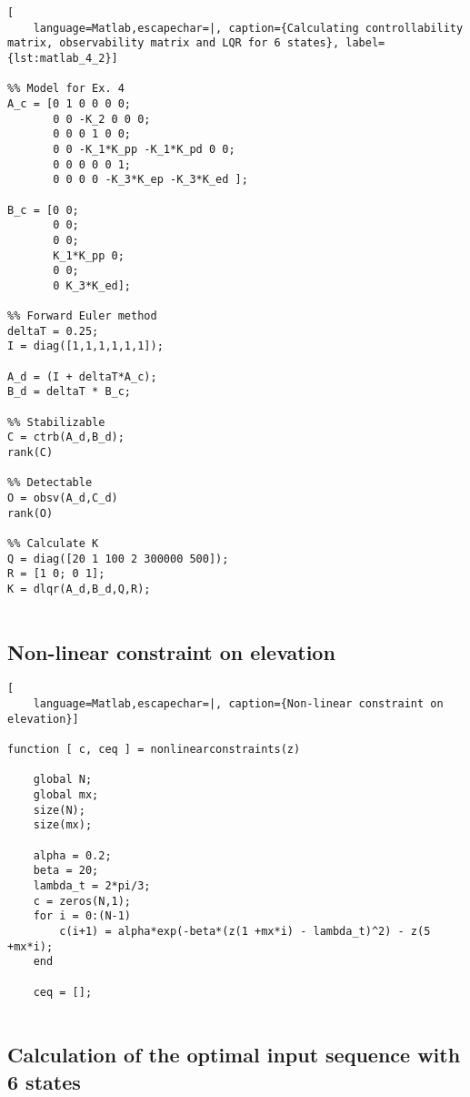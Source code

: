 \begin{lstlisting}[
    language=Matlab,escapechar=|, caption={Calculating controllability matrix, observability matrix and LQR for 6 states}, label={lst:matlab_4_2}]

%% Model for Ex. 4
A_c = [0 1 0 0 0 0;
       0 0 -K_2 0 0 0;
       0 0 0 1 0 0;
       0 0 -K_1*K_pp -K_1*K_pd 0 0; 
       0 0 0 0 0 1;
       0 0 0 0 -K_3*K_ep -K_3*K_ed ];
       
B_c = [0 0;
       0 0;
       0 0;
       K_1*K_pp 0;
       0 0;
       0 K_3*K_ed];

%% Forward Euler method
deltaT = 0.25;
I = diag([1,1,1,1,1,1]);

A_d = (I + deltaT*A_c);
B_d = deltaT * B_c;

%% Stabilizable
C = ctrb(A_d,B_d);
rank(C)

%% Detectable
O = obsv(A_d,C_d)
rank(O)

%% Calculate K
Q = diag([20 1 100 2 300000 500]);
R = [1 0; 0 1];
K = dlqr(A_d,B_d,Q,R);   
    
\end{lstlisting}
\newpage

\subsection{Non-linear constraint on elevation }\label{sec:matlab_connstrains}
\begin{lstlisting}[
    language=Matlab,escapechar=|, caption={Non-linear constraint on elevation}]

function [ c, ceq ] = nonlinearconstraints(z)
    
    global N;
    global mx;
    size(N);
    size(mx);
    
    alpha = 0.2;
    beta = 20;
    lambda_t = 2*pi/3;
    c = zeros(N,1);
    for i = 0:(N-1)
        c(i+1) = alpha*exp(-beta*(z(1 +mx*i) - lambda_t)^2) - z(5 +mx*i);
    end

    ceq = [];
    
\end{lstlisting}

\subsection{Calculation of the optimal input sequence with 6 states }\label{sec:matlab_4_3}


